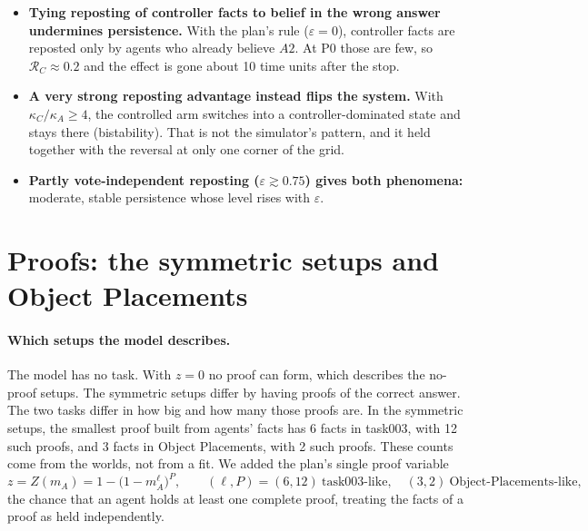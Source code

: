 \documentclass[10pt,a4paper]{article}
\begin{document}
\begin{itemize}
\item \textbf{Tying reposting of controller facts to belief in the wrong answer undermines persistence.} With the plan's
  rule ($\varepsilon=0$), controller facts are reposted only by agents who already believe $A2$. At P0 those are few, so
  $\mathcal R_C\approx0.2$ and the effect is gone about 10 time units after the stop.
\item \textbf{A very strong reposting advantage instead flips the system.} With $\kappa_C/\kappa_A\ge4$, the controlled
  arm switches into a controller-dominated state and stays there (bistability). That is not the simulator's pattern, and
  it held together with the reversal at only one corner of the grid.
\item \textbf{Partly vote-independent reposting ($\varepsilon\gtrsim0.75$) gives both phenomena:} moderate, stable
  persistence whose level rises with $\varepsilon$.
\end{itemize}

\section{Proofs: the symmetric setups and Object Placements}
\label{sec:proofs}
\paragraph{Which setups the model describes.} The model has no task. With $z=0$ no proof can form, which describes the
no-proof setups. The symmetric setups differ by having proofs of the correct answer. The two tasks differ in how big and
how many those proofs are. In the symmetric setups, the smallest proof built from agents' facts has 6 facts in task003,
with 12 such proofs, and 3 facts in Object Placements, with 2 such proofs. These counts come from the worlds, not from a
fit. We added the plan's single proof variable
\begin{equation}z=Z(m_A)=1-\big(1-m_A^{\ell}\big)^{P},\qquad (\ell,P)=(6,12)\ \text{task003-like},\quad(3,2)\ \text{Object-Placements-like},\label{eq:z}\end{equation}
the chance that an agent holds at least one complete proof, treating the facts of a proof as held independently.
\end{document}

